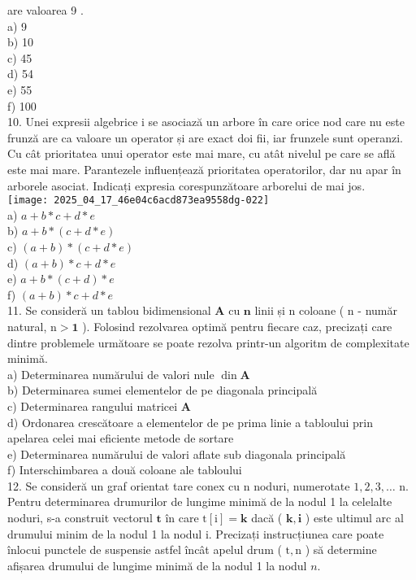 are valoarea 9 .\\
a) 9\\
b) 10\\
c) 45\\
d) 54\\
e) 55\\
f) 100\\
10. Unei expresii algebrice i se asociază un arbore în care orice nod care nu este frunză are ca valoare un operator și are exact doi fii, iar frunzele sunt operanzi. Cu cât prioritatea unui operator este mai mare, cu atât nivelul pe care se află este mai mare. Parantezele influențează prioritatea operatorilor, dar nu apar în arborele asociat. Indicați expresia corespunzătoare arborelui de mai jos.\\
\texttt{[image: 2025\_04\_17\_46e04c6acd873ea9558dg-022]}\\
a) $a+b * c+d * e$\\
b) $a+b *(c+d * e)$\\
c) $(a+b) *(c+d * e)$\\
d) $(a+b) * c+d * e$\\
e) $a+b *(c+d) * e$\\
f) $(a+b) * c+d * e$\\
11. Se consideră un tablou bidimensional $\mathbf{A}$ cu $\mathbf{n}$ linii și n coloane ( n - număr natural, $\mathrm{n}>\mathbf{1}$ ). Folosind rezolvarea optimă pentru fiecare caz, precizați care dintre problemele următoare se poate rezolva printr-un algoritm de complexitate minimă.\\
a) Determinarea numărului de valori nule $\operatorname{din} \mathbf{A}$\\
b) Determinarea sumei elementelor de pe diagonala principală\\
c) Determinarea rangului matricei $\mathbf{A}$\\
d) Ordonarea crescătoare a elementelor de pe prima linie a tabloului prin apelarea celei mai eficiente metode de sortare\\
e) Determinarea numărului de valori aflate sub diagonala principală\\
f) Interschimbarea a două coloane ale tabloului\\
12. Se consideră un graf orientat tare conex cu n noduri, numerotate $1,2,3, \ldots$ n. Pentru determinarea drumurilor de lungime minimă de la nodul 1 la celelalte noduri, s-a construit vectorul $\mathbf{t}$ în care $\mathrm{t}[\mathrm{i}]=\mathbf{k}$ dacă ( $\mathbf{k}, \mathbf{i}$ ) este ultimul arc al drumului minim de la nodul 1 la nodul i. Precizați instrucțiunea care poate înlocui punctele de suspensie astfel încât apelul drum ( $\mathrm{t}, \mathrm{n}$ ) să determine afișarea drumului de lungime minimă de la nodul 1 la nodul $n$.

